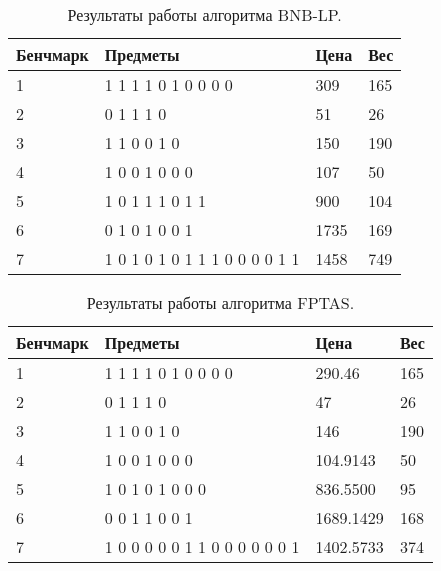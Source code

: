 \documentclass{article}
\begin{document}
\begin{table}[!h]
    \begin{center}
        \begin{tabular}{ | m{4.1em} | m{15em} | m{4.5em} | m{4.5em} |}
            \hline
            Бенчмарк & Предметы                      & Цена & Вес \\
            \hline
            1        & 1 1 1 1 0 1 0 0 0 0           & 309  & 165 \\
            \hline
            2        & 0 1 1 1 0                     & 51   & 26  \\
            \hline
            3        & 1 1 0 0 1 0                   & 150  & 190 \\
            \hline
            4        & 1 0 0 1 0 0 0                 & 107  & 50  \\
            \hline
            5        & 1 0 1 1 1 0 1 1               & 900  & 104 \\
            \hline
            6        & 0 1 0 1 0 0 1                 & 1735 & 169 \\
            \hline
            7        & 1 0 1 0 1 0 1 1 1 0 0 0 0 1 1 & 1458 & 749 \\
            \hline
        \end{tabular}
        \caption{Результаты работы алгоритма BNB-LP.}
    \end{center}
\end{table}


\begin{table}[!h]
    \begin{center}
        \begin{tabular}{ | m{4.1em} | m{15em} | m{4.5em} | m{4.5em} |}
            \hline
            Бенчмарк & Предметы                      & Цена      & Вес \\
            \hline
            1        & 1 1 1 1 0 1 0 0 0 0           & 290.46    & 165 \\
            \hline
            2        & 0 1 1 1 0                     & 47        & 26  \\
            \hline
            3        & 1 1 0 0 1 0                   & 146       & 190 \\
            \hline
            4        & 1 0 0 1 0 0 0                 & 104.9143  & 50  \\
            \hline
            5        & 1 0 1 0 1 0 0 0               & 836.5500  & 95  \\
            \hline
            6        & 0 0 1 1 0 0 1                 & 1689.1429 & 168 \\
            \hline
            7        & 1 0 0 0 0 0 1 1 0 0 0 0 0 0 1 & 1402.5733 & 374 \\
            \hline
        \end{tabular}
        \caption{Результаты работы алгоритма FPTAS.}
    \end{center}
\end{table}
\end{document}
